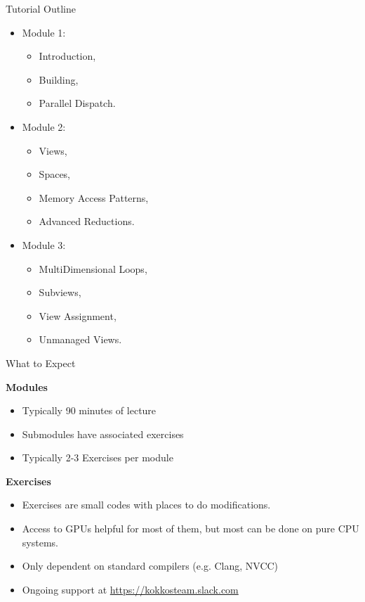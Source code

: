 \iffull
\begin{frame}{Tutorial Outline}

\begin{itemize}
        \item Module 1:
        \begin{itemize}
                \item Introduction,
                \item Building,
                \item Parallel Dispatch.
        \end{itemize}
	\item Module 2:
        \begin{itemize}
                \item Views,
                \item Spaces,
                \item Memory Access Patterns,
                \item Advanced Reductions.
        \end{itemize}
	\item Module 3:
        \begin{itemize}
                \item MultiDimensional Loops,
                \item Subviews,
                \item View Assignment,
                \item Unmanaged Views.
        \end{itemize}
\end{itemize}
\end{frame}
\fi

\begin{frame}{What to Expect}

\textbf{Modules}
\begin{itemize}
	\item Typically 90 minutes of lecture
	\item Submodules have associated exercises
	\item Typically 2-3 Exercises per module
\end{itemize}

	\vspace{10pt}

\textbf{Exercises}
\begin{itemize}
	\item Exercises are small codes with places to do modifications.
	\item Access to GPUs helpful for most of them, but most can be done on pure CPU systems.
	\item Only dependent on standard compilers (e.g. Clang, NVCC)
        \item Ongoing support at \url{https://kokkosteam.slack.com}
\end{itemize}
\end{frame}

